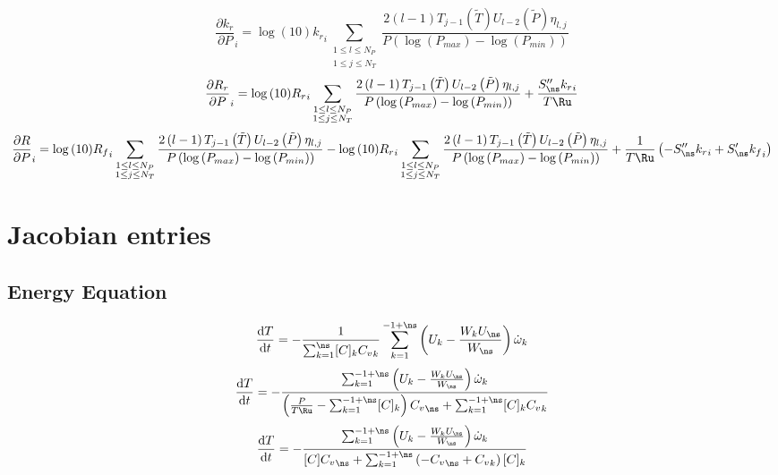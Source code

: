 \documentclass[a4paper,10pt]{article}
\begin{document}
\begin{dmath} \frac{\partial {k_r} }{\partial P }_{i} = \log{\left (10 \right )} {k_r}_{i} \sum_{\substack{1 \leq l \leq N_{P}\\1 \leq j \leq N_{T}}} \frac{2 \left(l - 1\right) T_{j - 1}\left(\tilde{T}\right) U_{l - 2}\left(\tilde{P}\right) \eta_{l,j}}{P \left(\log{\left (P_{max} \right )} - \log{\left (P_{min} \right )}\right)}\end{dmath} 
\begin{dmath} \frac{\partial {R_r} }{\partial P }_{i} = \log{\left (10 \right )} {R_r}_{i} \sum_{\substack{1 \leq l \leq N_{P}\\1 \leq j \leq N_{T}}} \frac{2 \left(l - 1\right) T_{j - 1}\left(\tilde{T}\right) U_{l - 2}\left(\tilde{P}\right) \eta_{l,j}}{P \left(\log{\left (P_{max} \right )} - \log{\left (P_{min} \right )}\right)} + \frac{S^{\prime\prime}_{\ns} {k_r}_{i}}{T \Ru}\end{dmath} 
\begin{dmath} \frac{\partial R }{\partial P }_{i} = \log{\left (10 \right )} {R_f}_{i} \sum_{\substack{1 \leq l \leq N_{P}\\1 \leq j \leq N_{T}}} \frac{2 \left(l - 1\right) T_{j - 1}\left(\tilde{T}\right) U_{l - 2}\left(\tilde{P}\right) \eta_{l,j}}{P \left(\log{\left (P_{max} \right )} - \log{\left (P_{min} \right )}\right)} - \log{\left (10 \right )} {R_r}_{i} \sum_{\substack{1 \leq l \leq N_{P}\\1 \leq j \leq N_{T}}} \frac{2 \left(l - 1\right) T_{j - 1}\left(\tilde{T}\right) U_{l - 2}\left(\tilde{P}\right) \eta_{l,j}}{P \left(\log{\left (P_{max} \right )} - \log{\left (P_{min} \right )}\right)} + \frac{1}{T \Ru} \left(- S^{\prime\prime}_{\ns} {k_r}_{i} + S^{\prime}_{\ns} {k_f}_{i}\right)\end{dmath} 
\section{Jacobian entries}
\subsection{Energy Equation}
\begin{dmath} \frac{\text{d} T }{\text{d} t } = - \frac{1}{\sum_{k=1}^{\ns} [C]_{k} {C_v}_{k}} \sum_{k=1}^{-1 + \ns} \left(U_{k} - \frac{W_{k} U_{\ns}}{W_{\ns}}\right) \dot{\omega}_{k}\end{dmath} 
\begin{dmath} \frac{\text{d} T }{\text{d} t } = - \frac{\sum_{k=1}^{-1 + \ns} \left(U_{k} - \frac{W_{k} U_{\ns}}{W_{\ns}}\right) \dot{\omega}_{k}}{\left(\frac{P}{T \Ru} - \sum_{k=1}^{-1 + \ns} [C]_{k}\right) {C_v}_{\ns} + \sum_{k=1}^{-1 + \ns} [C]_{k} {C_v}_{k}}\end{dmath} 
\begin{dmath} \frac{\text{d} T }{\text{d} t } = - \frac{\sum_{k=1}^{-1 + \ns} \left(U_{k} - \frac{W_{k} U_{\ns}}{W_{\ns}}\right) \dot{\omega}_{k}}{[C] {C_v}_{\ns} + \sum_{k=1}^{-1 + \ns} \left(- {C_v}_{\ns} + {C_v}_{k}\right) [C]_{k}}\end{dmath} 
\end{document}

